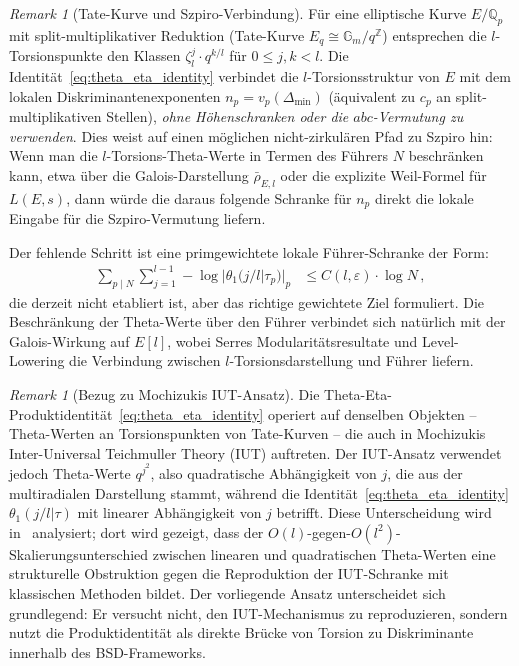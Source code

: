 \documentclass[aps,prd,twocolumn,superscriptaddress,nofootinbib,floatfix]{revtex4-2}
\theoremstyle{definition}
\theoremstyle{remark}
\newtheorem{remark}[theorem]{Remark}
\begin{document}
\begin{remark}[Tate-Kurve und Szpiro-Verbindung]
\label{rem:tate_szpiro}
Für eine elliptische Kurve $E/\mathbb{Q}_p$ mit split-multiplikativer Reduktion (Tate-Kurve $E_q\cong\mathbb{G}_m/q^{\mathbb{Z}}$) entsprechen die $l$-Torsionspunkte den Klassen $\zeta_l^j\cdot q^{k/l}$ für $0\leq j,k<l$. Die Identität~\eqref{eq:theta_eta_identity} verbindet die $l$-Torsionsstruktur von $E$ mit dem lokalen Diskriminantenexponenten $n_p=v_p(\Delta_{\min})$ (äquivalent zu $c_p$ an split-multiplikativen Stellen), \textit{ohne Höhenschranken oder die $abc$-Vermutung zu verwenden}. Dies weist auf einen möglichen nicht-zirkulären Pfad zu Szpiro hin: Wenn man die $l$-Torsions-Theta-Werte in Termen des Führers $N$ beschränken kann, etwa über die Galois-Darstellung $\bar{\rho}_{E,l}$ oder die explizite Weil-Formel für $L(E,s)$, dann würde die daraus folgende Schranke für $n_p$ direkt die lokale Eingabe für die Szpiro-Vermutung liefern.

Der fehlende Schritt ist eine primgewichtete lokale Führer-Schranke der Form:
\begin{equation}
\begin{aligned}
\sum_{p\mid N}\sum_{j=1}^{l-1}
-\log|\theta_1(j/l|\tau_p)|_p
&\leq C(l,\varepsilon)\cdot\log N\,,
\end{aligned}
\label{eq:theta_conductor_bound}
\end{equation}
die derzeit nicht etabliert ist, aber das richtige gewichtete Ziel formuliert. Die Beschränkung der Theta-Werte über den Führer verbindet sich natürlich mit der Galois-Wirkung auf $E[l]$, wobei Serres Modularitätsresultate und Level-Lowering die Verbindung zwischen $l$-Torsionsdarstellung und Führer liefern.
\end{remark}

\begin{remark}[Bezug zu Mochizukis IUT-Ansatz]
\label{rem:iut_comparison}
Die Theta-Eta-Produktidentität~\eqref{eq:theta_eta_identity} operiert auf denselben Objekten -- Theta-Werten an Torsionspunkten von Tate-Kurven -- die auch in Mochizukis Inter-Universal Teichmuller Theory (IUT) auftreten. Der IUT-Ansatz verwendet jedoch Theta-Werte $q^{j^2}$, also quadratische Abhängigkeit von $j$, die aus der multiradialen Darstellung stammt, während die Identität~\eqref{eq:theta_eta_identity} $\theta_1(j/l|\tau)$ mit linearer Abhängigkeit von $j$ betrifft. Diese Unterscheidung wird in~\cite{GeigerIUT2026} analysiert; dort wird gezeigt, dass der $O(l)$-gegen-$O(l^2)$-Skalierungsunterschied zwischen linearen und quadratischen Theta-Werten eine strukturelle Obstruktion gegen die Reproduktion der IUT-Schranke mit klassischen Methoden bildet. Der vorliegende Ansatz unterscheidet sich grundlegend: Er versucht nicht, den IUT-Mechanismus zu reproduzieren, sondern nutzt die Produktidentität als direkte Brücke von Torsion zu Diskriminante innerhalb des BSD-Frameworks.
\end{remark}
\end{document}
